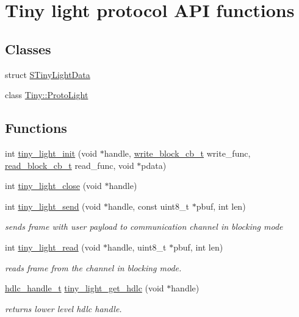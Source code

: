\hypertarget{group__LIGHT__API}{}\section{Tiny light protocol A\+PI functions}
\label{group__LIGHT__API}
\subsection*{Classes}
\begin{DoxyCompactItemize}
\item 
struct \hyperlink{structSTinyLightData}{S\+Tiny\+Light\+Data}
\item 
class \hyperlink{classTiny_1_1ProtoLight}{Tiny\+::\+Proto\+Light}
\end{DoxyCompactItemize}
\subsection*{Functions}
\begin{DoxyCompactItemize}
\item 
int \hyperlink{group__LIGHT__API_ga221cf790724163d1aee89ad6a6c9a14d}{tiny\+\_\+light\+\_\+init} (void $\ast$handle, \hyperlink{tiny__types_8h_aafd634660bba76cace57a8f9b01e044d}{write\+\_\+block\+\_\+cb\+\_\+t} write\+\_\+func, \hyperlink{tiny__types_8h_a15bec127d9ee63658563d62e92b5261b}{read\+\_\+block\+\_\+cb\+\_\+t} read\+\_\+func, void $\ast$pdata)
\item 
int \hyperlink{group__LIGHT__API_ga6e045b8f4ef551c274fbacaa625e2748}{tiny\+\_\+light\+\_\+close} (void $\ast$handle)
\item 
int \hyperlink{group__LIGHT__API_ga12391f0d4c06fb6296b84fd4681a87f7}{tiny\+\_\+light\+\_\+send} (void $\ast$handle, const uint8\+\_\+t $\ast$pbuf, int len)
\begin{DoxyCompactList}\small\item\em sends frame with user payload to communication channel in blocking mode \end{DoxyCompactList}\item 
int \hyperlink{group__LIGHT__API_ga0181db79922917957779e1f2d740c407}{tiny\+\_\+light\+\_\+read} (void $\ast$handle, uint8\+\_\+t $\ast$pbuf, int len)
\begin{DoxyCompactList}\small\item\em reads frame from the channel in blocking mode. \end{DoxyCompactList}\item 
\hyperlink{group__HDLC__API_gabeaf7578aed5279d3af891bd85a9f961}{hdlc\+\_\+handle\+\_\+t} \hyperlink{group__LIGHT__API_gabf582877977ecd57299d8675a1279e36}{tiny\+\_\+light\+\_\+get\+\_\+hdlc} (void $\ast$handle)
\begin{DoxyCompactList}\small\item\em returns lower level hdlc handle. \end{DoxyCompactList}\end{DoxyCompactItemize}



